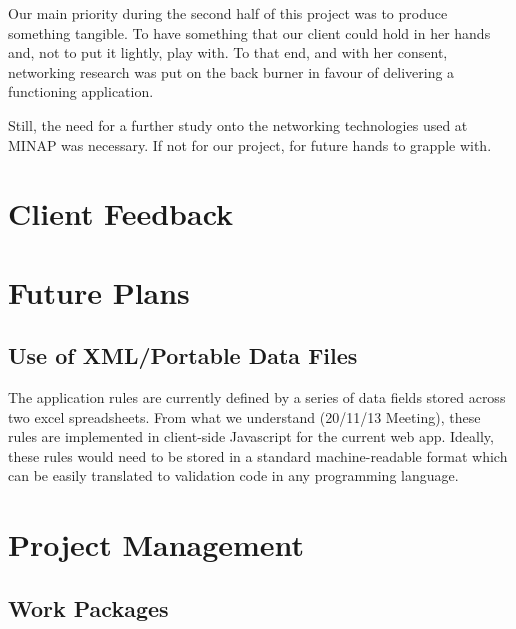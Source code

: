\documentclass[12pt,a4paper,oneside,titlepage]{article}
\begin{document}
Our main priority during the second half of this project was to produce something tangible. To have something that our client could hold in her hands and, not to put it lightly, play with. To that end, and with her consent, networking research was put on the back burner in favour of delivering a functioning application.

Still, the need for a further study onto the networking technologies used at MINAP was necessary. If not for our project, for future hands to grapple with.

\newpage
\section{Client Feedback}

\newpage
\section{Future Plans}
\subsection{Use of XML/Portable Data Files}
The application rules are currently defined by a series of data fields stored across two excel spreadsheets. From what we understand (20/11/13 Meeting), these rules are implemented in client-side Javascript for the current web app. Ideally, these rules would need to be stored in a standard machine-readable format which can be easily translated to validation code in any programming language.

\newpage
\section{Project Management}


\subsection{Work Packages}
\end{document}

